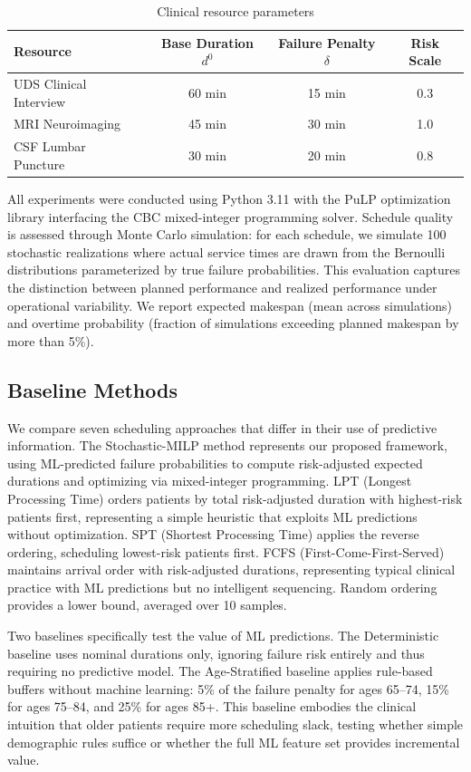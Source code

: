\begin{table}[htbp]
\centering
\caption{Clinical resource parameters}
\label{tab:resource_params}
\begin{tabular}{@{}lccc@{}}
\toprule
\textbf{Resource} & \textbf{Base Duration} $d^0$ & \textbf{Failure Penalty} $\delta$ & \textbf{Risk Scale} \\
\midrule
UDS Clinical Interview & 60 min & 15 min & 0.3 \\
MRI Neuroimaging & 45 min & 30 min & 1.0 \\
CSF Lumbar Puncture & 30 min & 20 min & 0.8 \\
\bottomrule
\end{tabular}
\end{table}

All experiments were conducted using Python 3.11 with the PuLP optimization library interfacing the CBC mixed-integer programming solver. Schedule quality is assessed through Monte Carlo simulation: for each schedule, we simulate 100 stochastic realizations where actual service times are drawn from the Bernoulli distributions parameterized by true failure probabilities. This evaluation captures the distinction between planned performance and realized performance under operational variability. We report expected makespan (mean across simulations) and overtime probability (fraction of simulations exceeding planned makespan by more than 5\%).

\subsection{Baseline Methods}
\label{sec:baselines}

We compare seven scheduling approaches that differ in their use of predictive information. The Stochastic-MILP method represents our proposed framework, using ML-predicted failure probabilities to compute risk-adjusted expected durations and optimizing via mixed-integer programming. LPT (Longest Processing Time) orders patients by total risk-adjusted duration with highest-risk patients first, representing a simple heuristic that exploits ML predictions without optimization. SPT (Shortest Processing Time) applies the reverse ordering, scheduling lowest-risk patients first. FCFS (First-Come-First-Served) maintains arrival order with risk-adjusted durations, representing typical clinical practice with ML predictions but no intelligent sequencing. Random ordering provides a lower bound, averaged over 10 samples.

Two baselines specifically test the value of ML predictions. The Deterministic baseline uses nominal durations only, ignoring failure risk entirely and thus requiring no predictive model. The Age-Stratified baseline applies rule-based buffers without machine learning: 5\% of the failure penalty for ages 65--74, 15\% for ages 75--84, and 25\% for ages 85+. This baseline embodies the clinical intuition that older patients require more scheduling slack, testing whether simple demographic rules suffice or whether the full ML feature set provides incremental value.

